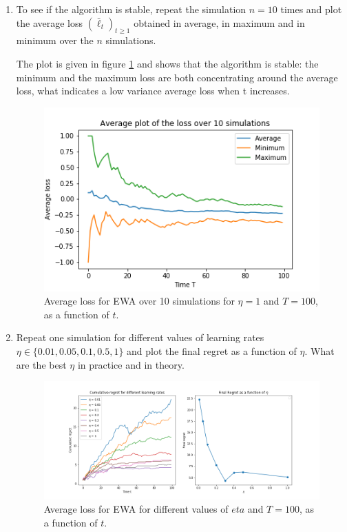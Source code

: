 \begin{enumerate}[resume]
\begin{enumerate}[label=(\alph*)]
 		
 		\item To see if the algorithm is stable, repeat the simulation $n = 10$ times and plot the average loss $(\bar \ell_t)_{t\geq 1}$ obtained in average, in maximum and in minimum over the $n$ simulations.
 		
	    \begin{solution}
	    The plot is given in figure \ref{fig:loss-measures} and shows that the algorithm is stable: the minimum and the maximum loss are both concentrating around the average loss, what indicates a low variance average loss when t increases.
	\begin{figure}   
    \begin{center}
    \includegraphics[height=150 pt]{image1/q3e_average_simulations.png}
    \end{center}
    \caption{Average loss for EWA over 10 simulations for $\eta = 1$ and $T=100$, as a function of $t$.}
    \label{fig:loss-measures}
    \end{figure}
        \end{solution}
 	
 		\item Repeat one simulation for different values of learning rates $\eta \in \{0.01,0.05,0.1,0.5,1\}$ and plot the final regret as a function of $\eta$. What are the best $\eta$ in practice and in theory.
 		
	    \begin{solution}
    \begin{figure}[h!]  
    \begin{center}
    \includegraphics[height=170 pt]{image1/q3f_eta_variations_100.png}
    \end{center}
    \caption{Average loss for EWA for different values of $eta$ and $T=100$, as a function of $t$.}
    \end{figure}
    

\end{solution}
\end{enumerate}
\end{enumerate}
